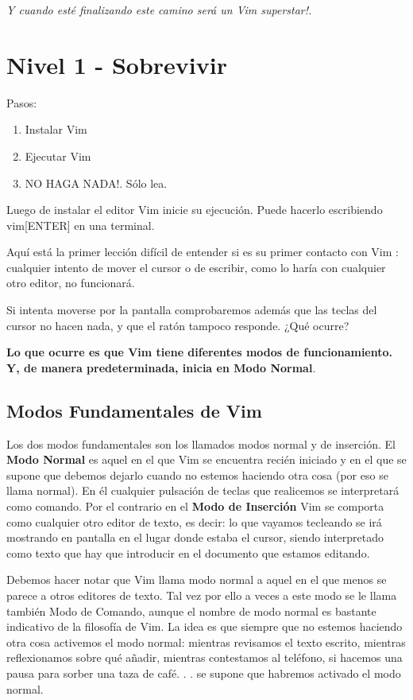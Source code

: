\documentclass[12pt]{article}
\begin{document}
\textit{Y cuando esté finalizando este camino será un Vim superstar!.}


\section{Nivel 1 - Sobrevivir}


Pasos:

\begin{enumerate}
	\item Instalar Vim
	\item Ejecutar Vim
	\item NO HAGA NADA!. Sólo lea.
\end{enumerate}

Luego de instalar el editor Vim inicie su ejecución. Puede hacerlo
escribiendo vim[ENTER] en una terminal.

Aquí está la primer lección difícil de entender si es su primer contacto
con Vim : cualquier intento de mover el cursor o de escribir, como lo haría con cualquier otro
editor, no funcionará.

Si intenta moverse por la
pantalla comprobaremos además que las teclas del cursor no hacen nada, y que el
ratón tampoco responde.
¿Qué ocurre? 

\textbf{Lo que ocurre es que Vim tiene diferentes modos de funcionamiento.
Y, de manera predeterminada, inicia en Modo Normal}.


\subsection{Modos Fundamentales de Vim}

Los dos modos fundamentales son los llamados modos normal y de inserción. 
El \textbf{Modo Normal} es aquel
en el que Vim se encuentra recién iniciado y en el que se supone que debemos
dejarlo cuando no estemos haciendo otra cosa (por eso se llama normal). En él
cualquier pulsación de teclas que realicemos se interpretará como comando. Por
el contrario en el \textbf{Modo de Inserción} Vim se comporta como cualquier
otro editor de texto, es decir: lo que vayamos tecleando se irá mostrando en
pantalla en el lugar donde estaba el cursor, siendo interpretado como texto que
hay que introducir en el documento que estamos editando.

Debemos hacer notar que Vim llama modo normal a aquel en el que menos se
parece a otros editores de texto. Tal vez por ello a veces a este modo se le
llama también Modo de Comando, aunque el nombre de modo normal es bastante
indicativo de la filosofía de Vim. La idea es que siempre que no estemos
haciendo otra cosa activemos el modo normal: mientras revisamos el texto
escrito, mientras reflexionamos sobre qué añadir, mientras contestamos al
teléfono, si hacemos una pausa para sorber una taza de café. . . 
se supone que habremos activado el modo normal.
\end{document}
